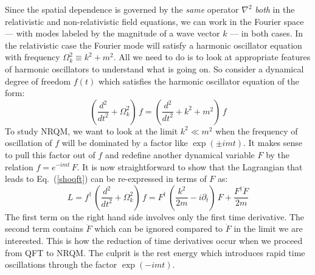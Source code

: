 \documentclass[12pt]{article}
\def\eq#1{{Eq.~(\ref{#1})}}
\begin{document}
Since the spatial dependence is governed by the \textit{same} operator $\nabla^2$ \textit{both }in the relativistic and non-relativistic field equations, we can work in the Fourier space --- with modes labeled by the magnitude of a wave vector $k$ --- in both cases.  In the relativistic case the Fourier mode will satisfy a harmonic oscillator equation with frequency $\Omega_k^2\equiv k^2+m^2$. All  we need to do is to look at appropriate features of harmonic oscillators to understand what is going on. So consider a dynamical degree of freedom $f(t)$ which satisfies the harmonic oscillator equation of the form:
\begin{equation}
 \left( \frac{d^2}{dt^2} + \Omega_k^2\right)\, f = \left( \frac{d^2}{dt^2} + k^2 + m^2 \right)\, f
 \label{shoqft}
\end{equation} 
 To study NRQM, we want to look at the limit $k^2 \ll m^2$ when the frequency of oscillation of $f$ will be dominated by a factor like $\exp(\pm imt)$. It makes sense to pull this factor out of $f$ and redefine another dynamical variable $F$ by the relation $f= e^{-imt}\, F$.  It is now straightforward to show that the Lagrangian that leads to \eq{shoqft} can be re-expressed in terms of $F$ as:
\begin{equation}
 L= f^\dagger\, \left( \frac{d^2}{dt^2} + \Omega_k^2\right)\, f = F^\dagger\, \left( \frac{k^2}{2m} - i \partial_t\right) \, F + \frac{F^\dagger\ddot F}{2m}
\end{equation} 
The first term on the right hand side involves only the first time derivative. The second term contains $\ddot F$ which can be ignored compared to $\dot F$ in the limit we are interested. This is how the reduction of time derivatives occur when we proceed from QFT to NRQM. The culprit is the rest energy which introduces rapid time oscillations through the factor $\exp(-imt)$. 
\end{document}
